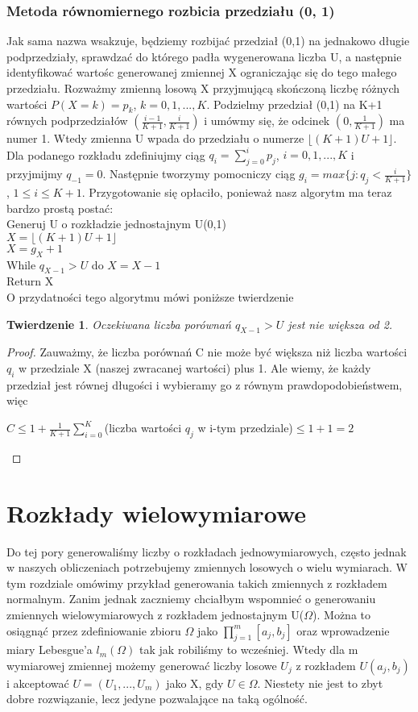 \documentclass[a4paper]{scrartcl}
\newtheorem{theorem}{Twierdzenie}
\begin{document}
\subsubsection{Metoda równomiernego rozbicia przedziału (0, 1)}
\qquad Jak sama nazwa wsakzuje, będziemy rozbijać przedział (0,1) na jednakowo długie podprzedziały, sprawdzać do którego padła wygenerowana liczba U, a następnie identyfikować wartośc generowanej zmiennej X ograniczając się do tego małego przedziału. Rozważmy zmienną losową X przyjmującą skończoną liczbę różnych wartości $P(X=k)=p_k$, $k=0,1,...,K$. Podzielmy przedział (0,1) na K+1 równych podprzedziałów $(\frac{i-1}{K+1}, \frac{i}{K+1})$ i umówmy się, że odcinek $(0, \frac{1}{K+1})$ ma numer 1. Wtedy zmienna U wpada do przedziału o numerze $\lfloor (K+1)U+1 \rfloor$. Dla podanego rozkładu zdefiniujmy ciąg $q_i=\sum_{j=0}^ip_j$, $i=0, 1,...,K$ i przyjmijmy $q_{-1}=0$. Następnie tworzymy pomocniczy ciąg $g_i=max\{j:q_j < \frac{i}{K+1}\}$, $1\leq i \leq K+1$. Przygotowanie się opłaciło, ponieważ nasz algorytm ma teraz bardzo prostą postać:\\
Generuj U o rozkładzie jednostajnym U(0,1)\\
\null\qquad $X=\lfloor (K+1)U+1 \rfloor$\\
\null\qquad $X=g_X+1$\\
\null\qquad While $q_{X-1}>U$ do $X=X-1$\\
Return X\\
O przydatności tego algorytmu mówi poniższe twierdzenie
\begin{theorem}
Oczekiwana liczba porównań $q_{X-1}>U$ jest nie większa od 2.
\end{theorem}
\begin{proof}
Zauważmy, że liczba porównań C nie może być większa niż liczba wartości $q_i$ w przedziale X (naszej zwracanej wartości) plus 1. Ale wiemy, że każdy przedział jest równej długości i wybieramy go z równym prawdopodobieństwem, więc
\begin{center}
$C \leq 1 + \frac{1}{K+1}\sum_{i=0}^K$(liczba wartości $q_j$ w i-tym przedziale)$\leq 1+1 = 2$
\end{center}
\end{proof}
\section{Rozkłady wielowymiarowe}
Do tej pory generowaliśmy liczby o rozkładach jednowymiarowych, często jednak w naszych obliczeniach potrzebujemy zmiennych losowych o wielu wymiarach. W tym rozdziale omówimy przykład generowania takich zmiennych z rozkładem normalnym. Zanim jednak zaczniemy chciałbym wspomnieć o generowaniu zmiennych wielowymiarowych z rozkładem jednostajnym U($\Omega$). Można to osiągnąć przez zdefiniowanie zbioru $\Omega$ jako $\prod_{j=1}^m[a_j, b_j]$ oraz wprowadzenie miary Lebesgue'a  $l_m(\Omega)$ tak jak robiliśmy to wcześniej. Wtedy dla m wymiarowej zmiennej możemy generować liczby losowe $U_j$ z rozkładem $U(a_j,b_j)$ i akceptować $U=(U_1,...,U_m)$ jako X, gdy $U \in \Omega$. Niestety nie jest to zbyt dobre rozwiązanie, lecz jedyne pozwalające na taką ogólność.
\end{document}
